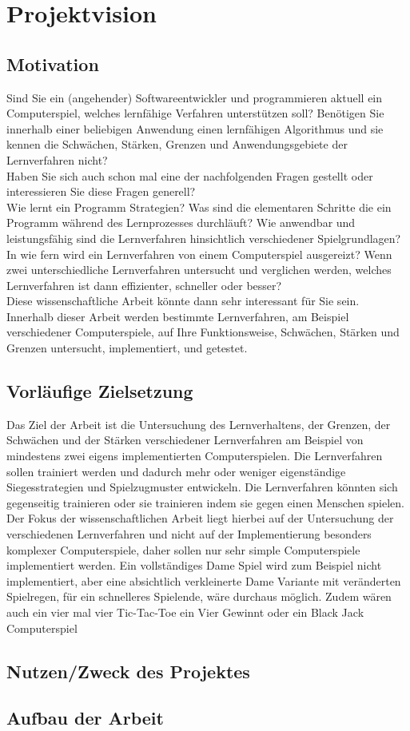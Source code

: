 \chapter{Projektvision}
\label{cha:projektvision}


\section{Motivation}
Sind Sie ein (angehender) Softwareentwickler und programmieren aktuell ein Computerspiel, welches lernfähige Verfahren unterstützen soll? Benötigen Sie innerhalb einer beliebigen Anwendung einen lernfähigen Algorithmus und sie kennen die Schwächen, Stärken, Grenzen und Anwendungsgebiete der Lernverfahren nicht?\\

Haben Sie sich auch schon mal eine der nachfolgenden Fragen gestellt oder interessieren Sie diese Fragen generell?\\

Wie lernt ein Programm Strategien? Was sind die elementaren Schritte die ein Programm  während des Lernprozesses durchläuft? Wie anwendbar und leistungsfähig sind die Lernverfahren hinsichtlich verschiedener Spielgrundlagen? In wie fern wird ein Lernverfahren von einem Computerspiel ausgereizt? Wenn zwei unterschiedliche Lernverfahren untersucht und verglichen werden, welches Lernverfahren ist dann effizienter, schneller oder besser?\\

Diese wissenschaftliche Arbeit könnte dann sehr interessant für Sie sein. Innerhalb dieser Arbeit werden bestimmte Lernverfahren, am Beispiel verschiedener Computerspiele, auf Ihre Funktionsweise, Schwächen, Stärken und Grenzen untersucht, implementiert, und getestet. 

\section{Vorläufige Zielsetzung}
Das Ziel der Arbeit ist die Untersuchung des Lernverhaltens, der Grenzen, der Schwächen und der Stärken verschiedener Lernverfahren am Beispiel von mindestens zwei eigens implementierten Computerspielen. Die Lernverfahren sollen trainiert werden und dadurch mehr oder weniger eigenständige Siegesstrategien und Spielzugmuster entwickeln. Die Lernverfahren könnten sich gegenseitig trainieren oder sie trainieren indem sie gegen einen Menschen spielen. Der Fokus der wissenschaftlichen Arbeit liegt hierbei auf der Untersuchung der verschiedenen Lernverfahren und nicht auf der Implementierung besonders komplexer Computerspiele, daher sollen nur sehr simple Computerspiele implementiert werden. Ein vollständiges Dame Spiel wird zum Beispiel nicht implementiert, aber eine absichtlich verkleinerte Dame Variante mit veränderten Spielregen, für ein schnelleres Spielende, wäre durchaus möglich. Zudem wären auch ein vier mal vier Tic-Tac-Toe ein Vier Gewinnt oder ein Black Jack Computerspiel

\section{Nutzen/Zweck des Projektes}

\section{Aufbau der Arbeit}